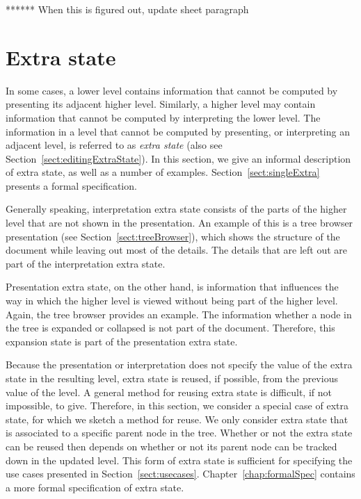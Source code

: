 ****** When this is figured out, update sheet paragraph
\ec




%																
%																
%																
\section{Extra state} \label{sect:extraState}



In some cases, a lower level contains information that cannot be computed by presenting its adjacent higher level. Similarly, a higher level may contain information that cannot be computed by interpreting the lower level. The information in a level that cannot be computed by presenting, or interpreting an adjacent level, is referred to as {\em extra state} (also see Section~\ref{sect:editingExtraState}). In this section, we give an informal description of extra state, as well as a number of examples. Section~\ref{sect:singleExtra} presents a formal specification.

Generally speaking, interpretation extra state consists of the parts of the higher level that are not shown in the presentation. An example of this is a tree browser presentation (see Section~\ref{sect:treeBrowser}), which shows the structure of the document while leaving out most of the details. The details that are left out are part of the interpretation extra state.

Presentation extra state, on the other hand, is information that influences the way in which the higher level is viewed without being part of the higher level. Again, the tree browser provides an example. The information whether a node in the tree is expanded or collapsed is not part of the document. Therefore, this expansion state is part of the presentation extra state.

Because the presentation or interpretation does not specify the value of the extra state in the resulting level, extra state is reused, if possible, from the previous value of the level. A general method for reusing extra state is difficult, if not impossible, to give. Therefore, in this section, we consider a special case of extra state, for which we sketch a method for reuse. We only consider extra state that is associated to a specific parent node in the tree. Whether or not the extra state can be reused then depends on whether or not its parent node can be tracked down in the updated level. This form of extra state is sufficient for specifying the use cases presented in Section~\ref{sect:usecases}. Chapter~\ref{chap:formalSpec} contains a more formal specification of extra state.


